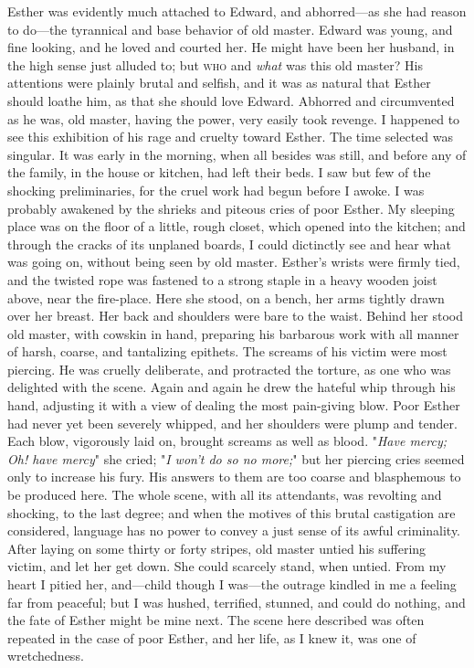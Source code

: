 Esther was evidently much attached to Edward, and abhorred---as she had
reason to do---the tyrannical and base behavior of old master. Edward
was young, and fine looking, and he loved and courted
{\protect\hypertarget{87}{}{}}her. He might have been her husband, in
the high sense just alluded to; but \textsc{who} and \emph{what} was
this old master? His attentions were plainly brutal and selfish, and it
was as natural that Esther should loathe him, as that she should love
Edward. Abhorred and circumvented as he was, old master, having the
power, very easily took revenge. I happened to see this exhibition of
his rage and cruelty toward Esther. The time selected was singular. It
was early in the morning, when all besides was still, and before any of
the family, in the house or kitchen, had left their beds. I saw but few
of the shocking preliminaries, for the cruel work had begun before I
awoke. I was probably awakened by the shrieks and piteous cries of poor
Esther. My sleeping place was on the floor of a little, rough closet,
which opened into the kitchen; and through the cracks of its unplaned
boards, I could dictinctly see and hear what was going on, without being
seen by old master. Esther's wrists were firmly tied, and the twisted
rope was fastened to a strong staple in a heavy wooden joist above, near
the fire-place. Here she stood, on a bench, her arms tightly drawn over
her breast. Her back and shoulders were bare to the waist. Behind her
stood old master, with cowskin in hand, preparing his barbarous work
with all manner of harsh, coarse, and tantalizing epithets. The screams
of his victim were most piercing. He was cruelly deliberate, and
protracted the torture, as one who was delighted with the scene. Again
and again he drew the hateful whip through his hand, adjusting it with a
view of dealing the most pain-giving blow. Poor Esther had never yet
been {\protect\hypertarget{88}{}{}}severely whipped, and her shoulders
were plump and tender. Each blow, vigorously laid on, brought screams as
well as blood. "\emph{Have mercy; Oh! have mercy}" she cried; "\emph{I
won't do so no more;}" but her piercing cries seemed only to increase
his fury. His answers to them are too coarse and blasphemous to be
produced here. The whole scene, with all its attendants, was revolting
and shocking, to the last degree; and when the motives of this brutal
castigation are considered, language has no power to convey a just sense
of its awful criminality. After laying on some thirty or forty stripes,
old master untied his suffering victim, and let her get down. She could
scarcely stand, when untied. From my heart I pitied her, and---child
though I was---the outrage kindled in me a feeling far from peaceful;
but I was hushed, terrified, stunned, and could do nothing, and the fate
of Esther might be mine next. The scene here described was often
repeated in the case of poor Esther, and her life, as I knew it, was one
of wretchedness.
